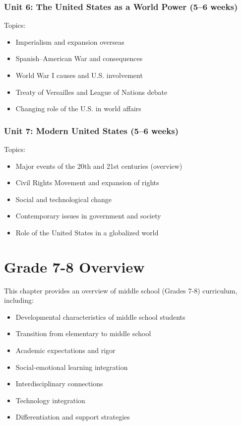 \documentclass[11pt,letterpaper]{report}
\begin{document}
\subsection{Unit 6: The United States as a World Power (5–6 weeks)}

Topics:
\begin{itemize}
\item Imperialism and expansion overseas
\item Spanish–American War and consequences
\item World War I causes and U.S. involvement
\item Treaty of Versailles and League of Nations debate
\item Changing role of the U.S. in world affairs
\end{itemize}

\subsection{Unit 7: Modern United States (5–6 weeks)}

Topics:
\begin{itemize}
\item Major events of the 20th and 21st centuries (overview)
\item Civil Rights Movement and expansion of rights
\item Social and technological change
\item Contemporary issues in government and society
\item Role of the United States in a globalized world
\end{itemize}


\chapter{Grade 7-8 Overview}

This chapter provides an overview of middle school (Grades 7-8) curriculum, including:

\begin{itemize}
    \item Developmental characteristics of middle school students
    \item Transition from elementary to middle school
    \item Academic expectations and rigor
    \item Social-emotional learning integration
    \item Interdisciplinary connections
    \item Technology integration
    \item Differentiation and support strategies
\end{itemize}
\end{document}
